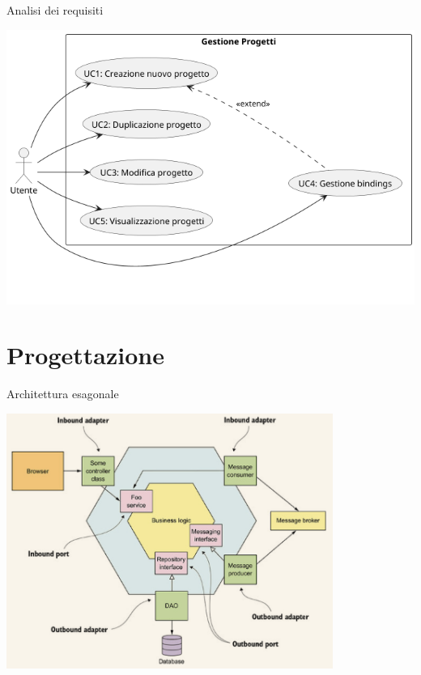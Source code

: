 \documentclass{beamer}
\begin{document}
\begin{frame}{Analisi dei requisiti}
\begin{center}
\begin{minipage}{0.50\textwidth}
        \end{minipage}
        \hfill
        \begin{minipage}{0.50\textwidth}
            \centering
            \includegraphics[width=\linewidth]{images/usecase/gestione_progetti.png}\\
        \end{minipage}
    \end{center}
\end{frame}

\section{Progettazione}
\begin{frame}{Architettura esagonale}
    \begin{center}
    \includegraphics[width=0.8\textwidth]{images/classes/hexagonal-architecture-pattern.png} %
    \end{center}
\end{frame}
\end{document}
